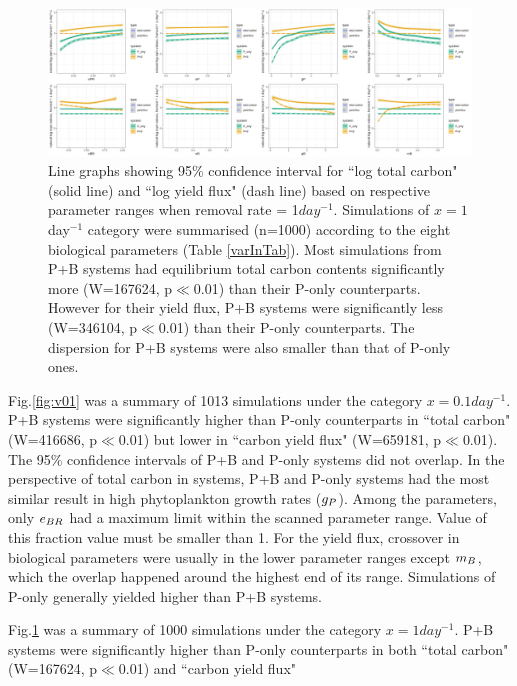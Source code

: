 \documentclass[../thesis.tex]{subfiles} %
\begin{document}
\subsection{\hIII}
\begin{figure}[H]
    \centering
    \includegraphics[width=\linewidth]{../result/var_10.png}
    \caption[95\% distribution for $x=1day^{-1}$]{Line graphs showing 95\% confidence interval for ``log total carbon" (solid line) and ``log yield flux" (dash line) based on respective parameter ranges when removal rate = 1$day^{-1}$.  {\scriptsize Simulations of $x=1$day$^{-1}$ category were summarised (n=1000) according to the eight biological parameters (Table \ref{varInTab}).  Most simulations from P+B systems had equilibrium total carbon contents significantly more (W=167624, p$\ll$0.01) than their P-only counterparts.  However for their yield flux, P+B systems were significantly less (W=346104, p$\ll$0.01) than their P-only counterparts.  The dispersion for P+B systems were also smaller than that of P-only ones.}}
    \label{fig:v10}
\end{figure}

Fig.\ref{fig:v01} was a summary of 1013 simulations under the category $x=0.1day^{-1}$.  P+B systems were significantly higher than P-only counterparts in ``total carbon" (W=416686, p$\ll$0.01) but lower in ``carbon yield flux" (W=659181, p$\ll$0.01).  The 95\% confidence intervals of P+B and P-only systems did not overlap.  In the perspective of total carbon in systems, P+B and P-only systems had the most similar result in high phytoplankton growth rates ($g_P$).  Among the parameters, only $e_{BR}$ had a maximum limit within the scanned parameter range.  Value of this fraction value must be smaller than 1.  For the yield flux, crossover in biological parameters were usually in the lower parameter ranges except $m_B$, which the overlap happened around the highest end of its range.  Simulations of P-only generally yielded higher than P+B systems.

Fig.\ref{fig:v10} was a summary of 1000 simulations under the category $x=1day^{-1}$.  P+B systems were significantly higher than P-only counterparts in both ``total carbon" (W=167624, p$\ll$0.01) and ``carbon yield flux"
\end{document}

